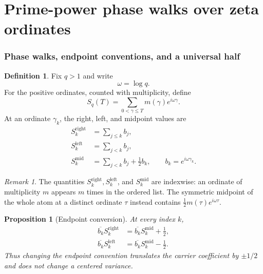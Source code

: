 \documentclass[11pt]{amsart}
\numberwithin{equation}{section}
\theoremstyle{plain}
\newtheorem{proposition}[theorem]{Proposition}
\theoremstyle{definition}
\newtheorem{definition}[theorem]{Definition}
\theoremstyle{remark}
\newtheorem{remark}[theorem]{Remark}
\newcommand{\1}{\mathbf{1}}
\begin{document}
\part{Prime-power phase walks over zeta ordinates}

\section{Phase walks, endpoint conventions, and a universal half}
\label{sec:phase_walks}

\begin{definition}
\label{def:phase_walk_q}
Fix \(q>1\) and write
\begin{equation}
\omega=\log q.
\label{eq:omega_definition}
\end{equation}
For the positive ordinates, counted with multiplicity, define
\begin{equation}
S_q(T)
=
\sum_{0<\gamma\leq T}m(\gamma)e^{i\omega\gamma}.
\label{eq:Sq_definition}
\end{equation}
At an ordinate \(\gamma_k\), the right, left, and midpoint values are
\begin{align}
S_k^{\mathrm{right}}
&=
\sum_{j\leq k}b_j,
\label{eq:right_sum}
\\
S_k^{\mathrm{left}}
&=
\sum_{j<k}b_j,
\label{eq:left_sum}
\\
S_k^{\mathrm{mid}}
&=
\sum_{j<k}b_j+\frac12b_k,
\qquad
b_k=e^{i\omega\gamma_k}.
\label{eq:mid_sum}
\end{align}
\end{definition}

\begin{remark}
\label{rem:indexwise_vs_atomic_midpoint}
The quantities \(S_k^{\mathrm{right}},S_k^{\mathrm{left}}\), and
\(S_k^{\mathrm{mid}}\) are indexwise: an ordinate of multiplicity \(m\)
appears \(m\) times in the ordered list.  The symmetric midpoint of the
whole atom at a distinct ordinate \(\tau\) instead contains
\(\frac12m(\tau)e^{i\omega\tau}\).
\end{remark}

\begin{proposition}[Endpoint conversion]
\label{prop:endpoint_conversion}
At every index \(k\),
\begin{align}
\overline{b_k}S_k^{\mathrm{right}}
&=
\overline{b_k}S_k^{\mathrm{mid}}+\frac12,
\label{eq:right_mid_conversion}
\\
\overline{b_k}S_k^{\mathrm{left}}
&=
\overline{b_k}S_k^{\mathrm{mid}}-\frac12.
\label{eq:left_mid_conversion}
\end{align}
Thus changing the endpoint convention translates the carrier coefficient
by \(\pm1/2\) and does not change a centered variance.
\end{proposition}
\end{document}
